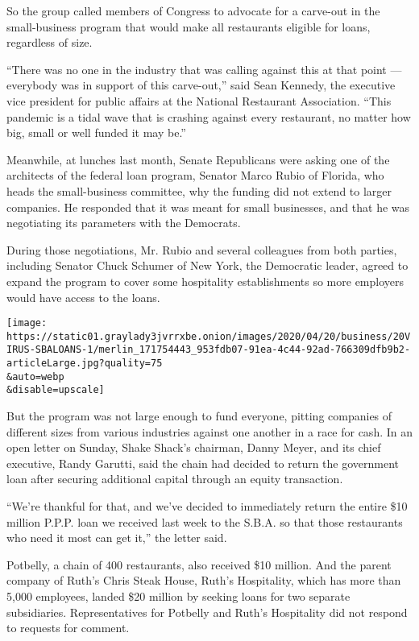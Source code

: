 So the group called members of Congress to advocate for a carve-out in
the small-business program that would make all restaurants eligible for
loans, regardless of size.

``There was no one in the industry that was calling against this at that
point --- everybody was in support of this carve-out,'' said Sean
Kennedy, the executive vice president for public affairs at the National
Restaurant Association. ``This pandemic is a tidal wave that is crashing
against every restaurant, no matter how big, small or well funded it may
be.''

Meanwhile, at lunches last month, Senate Republicans were asking one of
the architects of the federal loan program, Senator Marco Rubio of
Florida, who heads the small-business committee, why the funding did not
extend to larger companies. He responded that it was meant for small
businesses, and that he was negotiating its parameters with the
Democrats.

During those negotiations, Mr. Rubio and several colleagues from both
parties, including Senator Chuck Schumer of New York, the Democratic
leader, agreed to expand the program to cover some hospitality
establishments so more employers would have access to the loans.

\texttt{[image: https://static01.graylady3jvrrxbe.onion/images/2020/04/20/business/20VIRUS-SBALOANS-1/merlin\_171754443\_953fdb07-91ea-4c44-92ad-766309dfb9b2-articleLarge.jpg?quality=75\\\&auto=webp\\\&disable=upscale]}

But the program was not large enough to fund everyone, pitting companies
of different sizes from various industries against one another in a race
for cash. In an open letter on Sunday, Shake Shack's chairman, Danny
Meyer, and its chief executive, Randy Garutti, said the chain had
decided to return the government loan after securing additional capital
through an equity transaction.

``We're thankful for that, and we've decided to immediately return the
entire \$10 million P.P.P. loan we received last week to the S.B.A. so
that those restaurants who need it most can get it,'' the letter said.

Potbelly, a chain of 400 restaurants, also received \$10 million. And
the parent company of Ruth's Chris Steak House, Ruth's Hospitality,
which has more than 5,000 employees, landed \$20 million by seeking
loans for two separate subsidiaries. Representatives for Potbelly and
Ruth's Hospitality did not respond to requests for comment.

